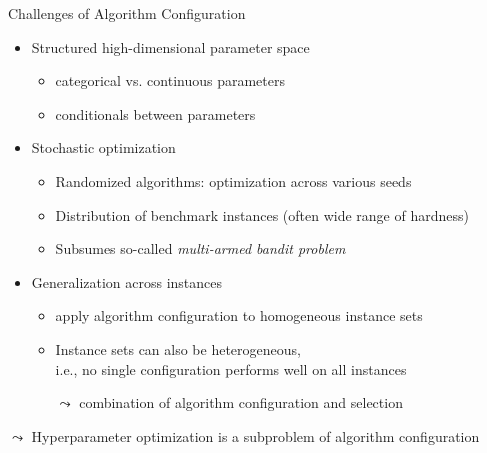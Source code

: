 \begin{frame}[c]{Challenges of Algorithm Configuration}

\begin{itemize}
\item \alert{Structured high-dimensional parameter space}
\begin{itemize}
\item categorical vs. continuous parameters
\item conditionals between parameters
\end{itemize}
\pause
\medskip
\item \alert{Stochastic optimization}
\begin{itemize}
\item Randomized algorithms: optimization across various seeds
\item Distribution of benchmark instances (often wide range of hardness)
\item Subsumes so-called \emph{multi-armed bandit problem}
\end{itemize}
\pause
\medskip
\item \alert{Generalization across instances}
\begin{itemize}
\item apply algorithm configuration to \alert{homogeneous} instance sets
\item Instance sets can also be \alert{heterogeneous},\\i.e., no single configuration performs well on all instances\\ 
\item[$\leadsto$] combination of algorithm configuration and selection
\end{itemize}

\end{itemize}

\pause
\medskip
$\leadsto$ Hyperparameter optimization is a subproblem of algorithm configuration\newline {}

\end{frame}


